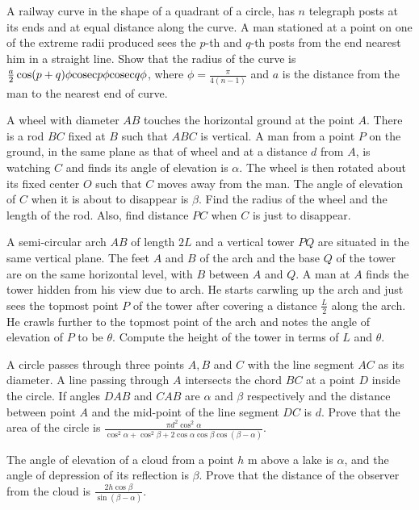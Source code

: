 \item A railway curve in the shape of a quadrant of a circle, has $n$ telegraph posts at its ends and at equal distance along
  the curve. A man stationed at a point on one of the extreme radii produced sees the $p$-th and $q$-th posts from
  the end nearest him in a straight line. Show that the radius of the curve is $\frac{a}{2}\cos(p + q)\phi{\rm
    cosec}p\phi{\rm cosec}q\phi$, where $\phi  = \frac{\pi}{4(n - 1)}$ and $a$ is the distance from the man to the
  nearest end of curve.

\item A wheel with diameter $AB$ touches the horizontal ground at the point $A$. There is a rod $BC$ fixed at
  $B$ such that $ABC$ is vertical. A man from a point $P$ on the ground, in the same plane as that of wheel
  and at a distance $d$ from $A$, is watching $C$ and finds its angle of elevation is $\alpha$. The
  wheel is then rotated about its fixed center $O$ such that $C$ moves away from the man. The angle of elevation of
  $C$ when it is about to disappear is $\beta$. Find the radius of the wheel and the length of the rod. Also, find
  distance $PC$ when $C$ is just to disappear.

\item A semi-circular arch $AB$ of length $2L$ and a vertical tower $PQ$ are situated in the same vertical
  plane. The feet $A$ and $B$ of the arch and the base $Q$ of the tower are on the same horizontal level, with
  $B$ between $A$ and $Q$. A man  at $A$ finds the tower hidden from his view due to arch. He starts
  carwling up the arch and just sees the topmost point $P$ of the tower after covering a distance $\frac{L}{2}$
  along the arch. He crawls further to the topmost point of the arch and notes the angle of elevation of $P$ to be
  $\theta$. Compute the height of the tower in terms of $L$ and $\theta$.

\item A circle passes through three points $A, B$ and $C$ with the line segment $AC$ as its diameter. A line
  passing through $A$ intersects the chord $BC$ at a point $D$ inside the circle. If angles $DAB$ and
  $CAB$ are $\alpha$ and $\beta$ respectively and the distance between point $A$ and the mid-point of
  the line segment $DC$ is $d$. Prove that the area of the circle is $\frac{\pi
    d^2\cos^2\alpha}{\cos^2\alpha + \cos^2\beta + 2\cos\alpha\cos\beta\cos(\beta - \alpha)}$.

\item The angle of elevation of a cloud from a point $h$ m above a lake is $\alpha$, and the angle of depression of its
  reflection is $\beta$. Prove that the distance of the observer from the cloud is $\frac{2h\cos\beta}{\sin(\beta -
    \alpha)}$.

